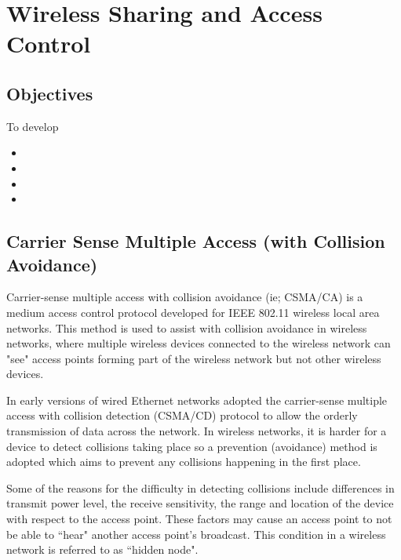 \chapter{Wireless Sharing and Access Control}\label{waccess}

\minitoc 

\clearpage
\section*{Objectives}
To develop 
\begin{itemize}

\item 

\item 

\item 

\item 

\end{itemize}

\section{Carrier Sense Multiple Access (with Collision Avoidance)}\label{CSMA/CA}

Carrier-sense multiple access with collision avoidance (ie; CSMA/CA) is a
medium access control protocol developed for IEEE 802.11 wireless local
area networks.  This method is used to assist with collision avoidance
in wireless networks, where multiple wireless devices connected to the
wireless network can "see" access points forming part of the wireless
network but not other wireless devices.

In early versions of wired Ethernet networks adopted the carrier-sense
multiple access with collision detection (CSMA/CD) protocol to allow the
orderly transmission of data across the network. In wireless networks, it
is harder for a device to detect collisions taking place so a prevention
(avoidance) method is adopted which aims to prevent any collisions
happening in the first place.

Some of the reasons for the difficulty in detecting collisions include
differences in transmit power level, the receive sensitivity, the
range and location of the device with respect to the access point. These
factors may cause an access point to not be able to ``hear" another access
point's broadcast. This condition in a wireless network is referred to as
``hidden node".

